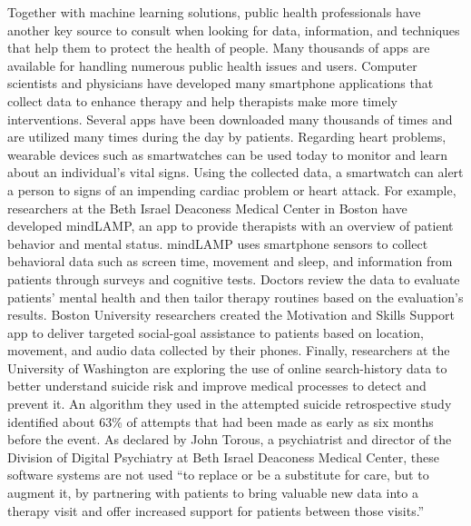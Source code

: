 Together with machine learning solutions, public health professionals have another key source to consult when looking for data, information, and techniques that help them to protect the health of people. Many thousands of apps are available for handling numerous public health issues and users. Computer scientists and physicians have developed many smartphone applications that collect data to enhance therapy and help therapists make more timely interventions. Several apps have been downloaded many thousands of times and are utilized many times during the day by patients. Regarding heart problems, wearable devices such as smartwatches can be used today to monitor and learn about an individual's vital signs. Using the collected data, a smartwatch can alert a person to signs of an impending cardiac problem or heart attack. For example, researchers at the Beth Israel Deaconess Medical Center in Boston have developed mindLAMP, an app to provide therapists with an overview of patient behavior and mental status. mindLAMP uses smartphone sensors to collect behavioral data such as screen time, movement and sleep, and information from patients through surveys and cognitive tests. Doctors review the data to evaluate patients' mental health and then tailor therapy routines based on the evaluation's results. Boston University researchers created the Motivation and Skills Support app to deliver targeted social-goal assistance to patients based on location, movement, and audio data collected by their phones. Finally, researchers at the University of Washington are exploring the use of online search-history data to better understand suicide risk and improve medical processes to detect and prevent it. An algorithm they used in the attempted suicide retrospective study identified about 63\% of attempts that had been made as early as six months before the event. As declared by John Torous, a psychiatrist and director of the \hbox{Division} of Digital Psychiatry at Beth Israel Deaconess Medical Center, these software systems are not used ``to replace or be a substitute for care, but to\vadjust{\vspace*{-18pt}\pagebreak} augment it, by partnering with patients to bring valuable new data into a therapy visit and offer increased support for patients between those visits.''

